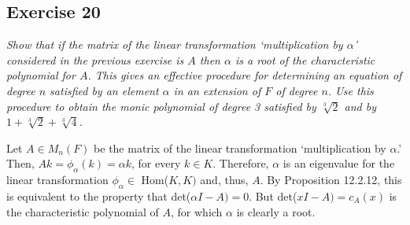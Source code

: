 \subsection*{Exercise 20}
\begin{framed}
\textit{Show that if the matrix of the linear transformation `multiplication by $\alpha$' considered in the previous exercise is $A$ then $\alpha$ is a root of the characteristic polynomial for $A$. This gives an effective procedure for determining an equation of degree $n$ satisfied by an element $\alpha$ in an extension of $F$ of degree $n$. Use this procedure to obtain the monic polynomial of degree 3 satisfied by $\sqrt[3]{2}$ and by $1 + \sqrt[3]{2} + \sqrt[3]{4}$.}
\end{framed}

Let $A \in M_n(F)$ be the matrix of the linear transformation `multiplication by $\alpha$.' Then, $Ak = \phi_\alpha(k) = \alpha k$, for every $k \in K$. Therefore, $\alpha$ is an eigenvalue for the linear transformation $\phi_\alpha \in$ Hom($K, K)$ and, thus, $A$. By Proposition 12.2.12, this is equivalent to the property that det($\alpha I - A) = 0$. But det($xI - A) = c_A(x)$ is the characteristic polynomial of $A$, for which $\alpha$ is clearly a root.

